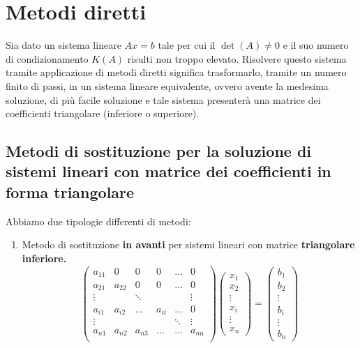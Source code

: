\documentclass[12pt, a4paper]{book}
\theoremstyle{definition}
\begin{document}
\section{Metodi diretti}
\begin{flushleft}
Sia dato un sistema lineare $Ax = b$ tale per cui il $\det(A) \neq 0$ e il suo numero di condizionamento $K(A)$ risulti non troppo elevato.
Risolvere questo sistema tramite applicazione di metodi diretti significa trasformarlo,  tramite un numero finito di passi, in un sistema lineare equivalente, ovvero avente la medesima soluzione,  di più facile soluzione e tale sistema presenterà una matrice dei coefficienti triangolare (inferiore o superiore).

\subsection{Metodi di sostituzione per la soluzione di sistemi lineari con matrice dei coefficienti in forma triangolare}

Abbiamo due tipologie differenti di metodi:

\begin{enumerate}
	\item Metodo di sostituzione \textbf{in avanti} per sistemi lineari con matrice \textbf{triangolare inferiore.}
	\[
		\begin{pmatrix}
			a_{11} & 0 & 0 &0 & \dots & 0 \\
			a_{21} & a_{22} & 0 & 0 & \dots & 0 \\
			\vdots & & \ddots &  & & \vdots \\
			a_{i1} & a_{i2} & \dots & a_{ii} & \dots & 0 \\
			\vdots & & & & \ddots &   \vdots \\
			a_{n1} & a_{n2} & a_{n3} & \dots &  \dots & a_{nn} \\
		\end{pmatrix}
		\begin{pmatrix}
			x_{1}  \\
			x_{2}  \\
			\vdots  \\
			x_{i}  \\
			\vdots  \\
			x_{n}
		\end{pmatrix}
		=
		\begin{pmatrix}
			b_{1}  \\
			b_{2}  \\
			\vdots  \\
			b_{i}  \\
			\vdots  \\
			b_{n}
		\end{pmatrix}
	\]
	

\end{enumerate}
\end{flushleft}
\end{document}
